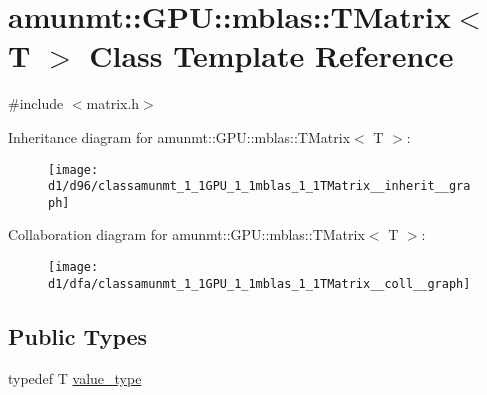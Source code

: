 \hypertarget{classamunmt_1_1GPU_1_1mblas_1_1TMatrix}{}\section{amunmt\+:\+:G\+PU\+:\+:mblas\+:\+:T\+Matrix$<$ T $>$ Class Template Reference}
\label{classamunmt_1_1GPU_1_1mblas_1_1TMatrix}


{\ttfamily \#include $<$matrix.\+h$>$}



Inheritance diagram for amunmt\+:\+:G\+PU\+:\+:mblas\+:\+:T\+Matrix$<$ T $>$\+:
\nopagebreak
\begin{figure}[H]
\begin{center}
\leavevmode
\texttt{[image: d1/d96/classamunmt\_1\_1GPU\_1\_1mblas\_1\_1TMatrix\_\_inherit\_\_graph]}
\end{center}
\end{figure}


Collaboration diagram for amunmt\+:\+:G\+PU\+:\+:mblas\+:\+:T\+Matrix$<$ T $>$\+:
\nopagebreak
\begin{figure}[H]
\begin{center}
\leavevmode
\texttt{[image: d1/dfa/classamunmt\_1\_1GPU\_1\_1mblas\_1\_1TMatrix\_\_coll\_\_graph]}
\end{center}
\end{figure}
\subsection*{Public Types}
\begin{DoxyCompactItemize}
\item 
typedef T \hyperlink{classamunmt_1_1GPU_1_1mblas_1_1TMatrix_afcab21668823619cd9578fea0cebd8df}{value\+\_\+type}
\end{DoxyCompactItemize}

